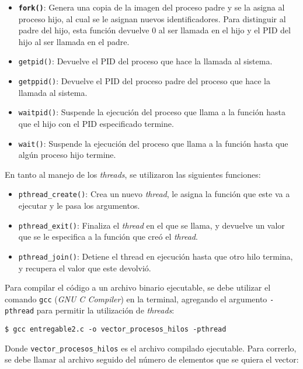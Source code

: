 \begin{itemize}
    \item \textbf{\texttt{fork()}}: Genera una copia de la imagen del proceso padre y se la asigna al proceso hijo, al cual se le asignan nuevos identificadores. Para distinguir al padre del hijo, esta función devuelve 0 al ser llamada en el hijo y el PID del hijo al ser llamada en el padre. 
    \item \texttt{getpid()}: Devuelve el PID del proceso que hace la llamada al sistema.
    \item \texttt{getppid()}: Devuelve el PID del proceso padre del proceso que hace la llamada al sistema.
    \item \texttt{waitpid()}: Suspende la ejecución del proceso que llama a la función hasta que el hijo con el PID especificado termine.
    \item \texttt{wait()}: Suspende la ejecución del proceso que llama a la función hasta que algún proceso hijo termine.\\
\end{itemize}

En tanto al manejo de los \textit{threads}, se utilizaron las siguientes funciones:

\begin{itemize}
    \item \texttt{pthread\_create()}: Crea un nuevo \textit{thread}, le asigna la función que este va a ejecutar y le pasa los argumentos.
    \item \texttt{pthread\_exit()}: Finaliza el \textit{thread} en el que se llama, y devuelve un valor que se le especifica a la función que creó el \textit{thread}.
    \item \texttt{pthread\_join()}: Detiene el thread en ejecución hasta que otro hilo termina, y recupera el valor que este devolvió.\\
\end{itemize}

Para compilar el código a un archivo binario ejecutable, se debe utilizar el comando \texttt{gcc} (\textit{GNU C Compiler}) en la terminal, agregando el argumento \texttt{-pthread} para permitir la utilización de \textit{threads}:

\begin{center}
    \texttt{\$ gcc entregable2.c -o vector\_procesos\_hilos -pthread}
\end{center}

Donde \texttt{vector\_procesos\_hilos} es el archivo compilado ejecutable. Para correrlo, se debe llamar al archivo seguido del número de elementos que se quiera el vector:

